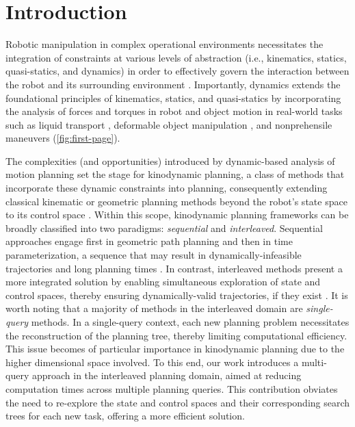 \section{Introduction}\label{sec:introduction}

Robotic manipulation in complex operational environments necessitates the integration of constraints at various levels of abstraction (i.e., kinematics, statics, quasi-statics, and dynamics) in order to effectively govern the interaction between the robot and its surrounding environment \cite{ruggiero2018nonprehensile,mason2018toward}.
Importantly, dynamics extends the foundational principles of kinematics, statics, and quasi-statics by incorporating the analysis of forces and torques in robot and object motion in real-world tasks such as liquid transport \cite{ichnowski2022gomp}, deformable object manipulation \cite{salhotra2022learning}, and nonprehensile maneuvers \cite{pasricha2022pokerrt,jia2019batting} (\cref{fig:first-page}).

The complexities (and opportunities) introduced by dynamic-based analysis of motion planning set the stage for kinodynamic planning, a class of methods that incorporate these dynamic constraints into planning, consequently extending classical kinematic or geometric planning methods beyond the robot's state space to its control space \cite{schmerling2019kinodynamic,lavalle2001randomized}.
Within this scope, 
kinodynamic planning frameworks can be broadly classified into two paradigms:
\textsl{sequential} and \textsl{interleaved}. 
Sequential approaches engage first in geometric path planning and then in time parameterization, a sequence that may result in dynamically-infeasible trajectories and long planning times \cite{pham2014general, kuntz2019fast}. 
In contrast, interleaved methods present a more integrated solution by enabling simultaneous exploration of state and control spaces, thereby ensuring dynamically-valid trajectories, if they exist \cite{littlefield2020efficient, li2016asymptotically}.
It is worth noting that a majority of methods in the interleaved domain are \textsl{single-query} methods.
In a single-query context, each new planning problem necessitates the reconstruction of the planning tree, thereby limiting computational efficiency. 
This issue becomes of particular importance in kinodynamic planning due to the higher dimensional space involved. 
To this end, our work introduces a multi-query approach in the interleaved planning domain, aimed at reducing computation times across multiple planning queries. This contribution obviates the need to re-explore the state and control spaces and their corresponding search trees for each new task, offering a more efficient solution.

